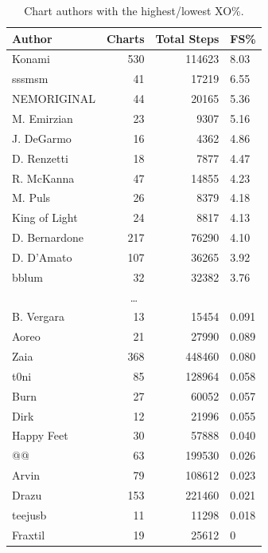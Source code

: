 \documentclass[10pt]{sigplanconf}
\begin{document}
\begin{table}[p]
	\begin{center}
		\small
	\begin{tabular}{l|r|r|l}
		\bf Author & \bf Charts & \bf Total Steps & \bf FS\% \\
		\hline
		Konami        & 530 & 114623 & 8.03 \\
		sssmsm        &  41 &  17219 & 6.55 \\
		NEMORIGINAL   &  44 &  20165 & 5.36 \\
		M. Emirzian   &  23 &   9307 & 5.16 \\
		J. DeGarmo    &  16 &   4362 & 4.86 \\
		D. Renzetti   &  18 &   7877 & 4.47 \\
		R. McKanna    &  47 &  14855 & 4.23 \\
		M. Puls       &  26 &   8379 & 4.18 \\
		King of Light &  24 &   8817 & 4.13 \\
		D. Bernardone & 217 &  76290 & 4.10 \\
		D. D'Amato    & 107 &  36265 & 3.92 \\
		bblum         &  32 &  32382 & 3.76 \\
		\multicolumn{4}{c}{\normalsize\dots} \\
		B. Vergara    &  13 &  15454 & 0.091 \\
		Aoreo         &  21 &  27990 & 0.089 \\
		Zaia          & 368 & 448460 & 0.080 \\
		t0ni          &  85 & 128964 & 0.058 \\
		Burn          &  27 &  60052 & 0.057 \\
		Dirk          &  12 &  21996 & 0.055 \\
		Happy Feet    &  30 &  57888 & 0.040 \\
		@@            &  63 & 199530 & 0.026 \\
		Arvin         &  79 & 108612 & 0.023 \\
		Drazu         & 153 & 221460 & 0.021 \\
		teejusb       &  11 &  11298 & 0.018 \\
		Fraxtil       &  19 &  25612 & 0 \\
	\end{tabular}
	\end{center}
	\caption{Chart authors with the highest/lowest XO\%.}
	\label{tab:author-xo}
\end{table}
\end{document}
